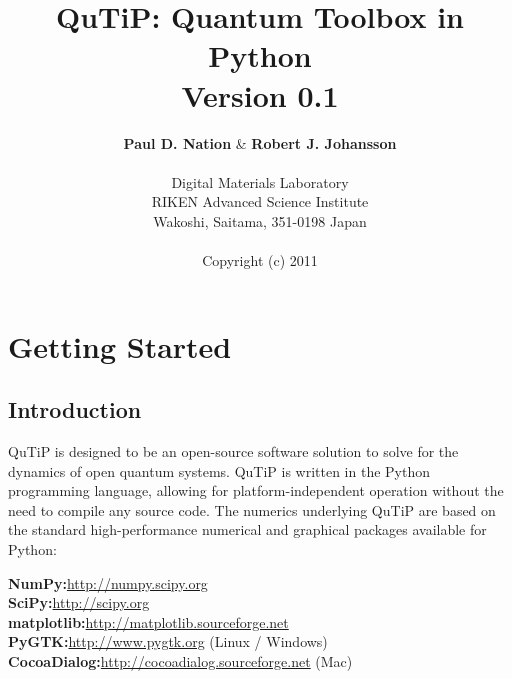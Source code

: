 \documentclass[11pt,letterpaper]{article}
\begin{document}
 

\title{\textbf{\huge{QuTiP: Quantum Toolbox in Python\\ \phantom{a}}}Version 0.1}

\author{\textbf{Paul D. Nation} \& \textbf{Robert J. Johansson}\\
\phantom{a}\\
Digital Materials Laboratory\\
RIKEN Advanced Science Institute\\
Wakoshi, Saitama, 351-0198 Japan\\
\phantom{a}\\
Copyright (c) 2011}
\date{}
\maketitle
\begin{multicols}{2}
\tableofcontents
\end{multicols}

\section{Getting Started}\label{sec:started}

\subsection{Introduction}\label{subsec:intro}
QuTiP is designed to be an open-source software solution to solve for the dynamics of open quantum systems.  QuTiP is written in the Python programming language, allowing for platform-independent operation without the need  to compile any source code.  The numerics underlying QuTiP are based on the standard high-performance numerical and graphical packages available for Python:
\begin{flushleft}
\hspace{1in}\textbf{NumPy:}\href{http://numpy.scipy.org}{http://numpy.scipy.org}\\
\hspace{1in}\textbf{SciPy:}\href{http://scipy.org}{http://scipy.org}\\
\hspace{1in}\textbf{matplotlib:}\href{http://matplotlib.sourceforge.net}{http://matplotlib.sourceforge.net}\\
\hspace{1in}\textbf{PyGTK:}\href{http://www.pygtk.org}{http://www.pygtk.org} (Linux / Windows)\\
\hspace{1in}\textbf{CocoaDialog:}\href{http://cocoadialog.sourceforge.net}{http://cocoadialog.sourceforge.net} (Mac)
\end{flushleft}
\end{document}
